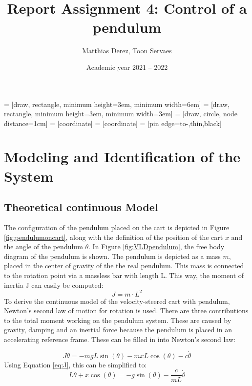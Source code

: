 \documentclass[a4paper,kul]{kulakarticle} %
\date{Academic year 2021 -- 2022}
\title{Report Assignment 4: Control of a pendulum}
\author{Matthias Derez, Toon Servaes}
\begin{document}
\maketitle

\tableofcontents
\listoffigures
{} = [draw, rectangle, 
minimum height=3em, minimum width=6em]
 = [draw, rectangle, 
minimum height=3em, minimum width=3em]
 = [draw, circle, node distance=1cm]
 = [coordinate]
 = [coordinate]
 = [pin edge={to-,thin,black}]


\newpage

\section{Modeling and Identification of the System}
\subsection{Theoretical continuous Model}
The configuration of the pendulum placed on the cart is depicted in Figure \ref{fig:pendulumoncart}, along with the definition of the position of the cart $x$ and the angle of the pendulum $\theta$. In Figure \ref{fig:VLDpendulum}, the free body diagram of the pendulum is shown. The pendulum is depicted as a mass $m$, placed in the center of gravity of the the real pendulum. This mass is connected to the rotation point via a massless bar with length L. This way, the moment of inertia J can easily be computed: 
\begin{equation}
	J = m \cdot L^2
	\label{eq:J}
\end{equation}
To derive the continuous model of the velocity-steered cart with pendulum, Newton's second law of motion for rotation is used. There are three contributions to the total moment working on the pendulum system. These are caused by gravity, damping and an inertial force because the pendulum is placed in an accelerating reference frame. These can be filled in into Newton's second law:

\begin{equation}
	J\ddot{\theta}=-mgL\sin(\theta) - m\ddot{x}L\cos(\theta) - c\dot{\theta}
\end{equation}
Using Equation \ref{eq:J}, this can be simplified to:
\begin{equation}
	L\ddot{\theta}+\ddot{x}\cos(\theta) = -g\sin(\theta) - \frac{c}{mL}\dot{\theta}
	\label{eq:newton}
\end{equation}
\end{document}
